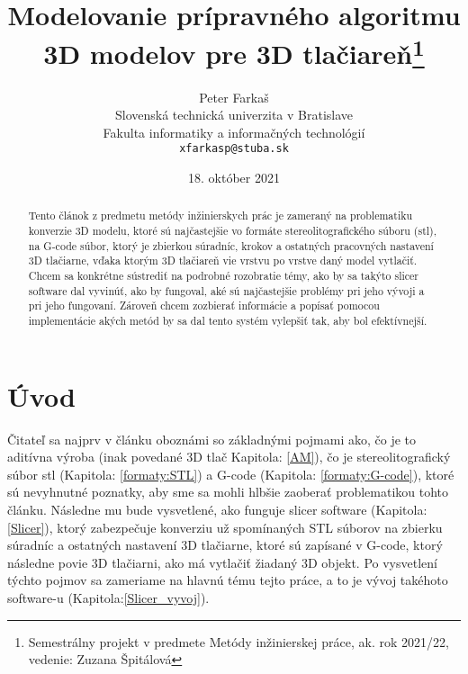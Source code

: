 \documentclass[10pt,twoside,slovak,a4paper]{article}
\title{Modelovanie prípravného algoritmu 3D modelov pre 3D tlačiareň\thanks{Semestrálny projekt v predmete Metódy inžinierskej práce, ak. rok 2021/22, vedenie: Zuzana Špitálová}}
\author{Peter Farkaš\\[2pt]
	{\small Slovenská technická univerzita v Bratislave}\\
	{\small Fakulta informatiky a informačných technológií}\\
	{\small \texttt{xfarkasp@stuba.sk}}
	}
\date{\small 18. október 2021}
\begin{document}
\maketitle

\begin{abstract}
    Tento článok z predmetu metódy inžinierskych prác je zameraný na problematiku konverzie 3D modelu, ktoré sú najčastejšie vo formáte stereolitografického súboru (stl), na G-code súbor, ktorý je zbierkou súradníc, krokov a ostatných pracovných nastavení 3D tlačiarne, vďaka ktorým 3D tlačiareň vie vrstvu po vrstve daný model vytlačiť. Chcem sa konkrétne sústrediť na podrobné rozobratie témy, ako by sa takýto slicer software dal vyvinúť, ako by fungoval, aké sú najčastejšie problémy pri jeho vývoji a pri jeho fungovaní. Zároveň chcem zozbierať informácie a popísať pomocou implementácie akých metód by sa dal tento systém vylepšiť tak, aby bol efektívnejší.
\end{abstract}

\section{Úvod}
    Čitateľ sa najprv v článku oboznámi so základnými pojmami ako, čo je to aditívna výroba (inak povedané 3D tlač Kapitola: \ref{AM}), čo je stereolitografický súbor stl (Kapitola: \ref{formaty:STL}) a G-code (Kapitola: \ref{formaty:G-code}), ktoré sú nevyhnutné poznatky, aby sme sa mohli hlbšie zaoberať problematikou tohto článku. Následne mu bude vysvetlené, ako funguje slicer software (Kapitola: \ref{Slicer}), ktorý zabezpečuje konverziu už spomínaných STL súborov na zbierku súradníc a ostatných nastavení 3D tlačiarne, ktoré sú zapísané v G-code, ktorý následne povie 3D tlačiarni, ako má vytlačiť žiadaný 3D objekt. Po vysvetlení týchto pojmov sa zameriame na hlavnú tému tejto práce, a to je vývoj takéhoto software-u (Kapitola:\ref{Slicer_vyvoj}). 
\end{document}

